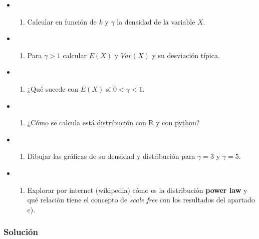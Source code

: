 \documentclass[
]{article}
\providecommand{\tightlist}{%
  \setlength{\itemsep}{0pt}\setlength{\parskip}{0pt}}
\begin{document}
\begin{itemize}
\item
  \begin{enumerate}
  \def\labelenumi{\alph{enumi})}
  \tightlist
  \item
    Calcular en función de \(k\) y \(\gamma\) la densidad de la variable
    \(X\).
  \end{enumerate}
\item
  \begin{enumerate}
  \def\labelenumi{\alph{enumi})}
  \setcounter{enumi}{1}
  \tightlist
  \item
    Para \(\gamma>1\) calcular \(E(X)\) y \(Var(X)\) y su desviación
    típica.
  \end{enumerate}
\item
  \begin{enumerate}
  \def\labelenumi{\alph{enumi})}
  \setcounter{enumi}{2}
  \tightlist
  \item
    ¿Qué sucede con \(E(X)\) si \(0<\gamma<1\).
  \end{enumerate}
\item
  \begin{enumerate}
  \def\labelenumi{\alph{enumi})}
  \setcounter{enumi}{3}
  \tightlist
  \item
    ¿Cómo se calcula está
    \href{https://www.rdocumentation.org/packages/EnvStats/versions/2.3.1/topics/Pareto}{distribución
    con R}
    \href{https://docs.scipy.org/doc/scipy/reference/generated/scipy.stats.Pareto.html}{y
    con python}?
  \end{enumerate}
\item
  \begin{enumerate}
  \def\labelenumi{\alph{enumi})}
  \setcounter{enumi}{4}
  \tightlist
  \item
    Dibujar las gráficas de su densidad y distribución para \(\gamma=3\)
    y \(\gamma=5\).
  \end{enumerate}
\item
  \begin{enumerate}
  \def\labelenumi{\alph{enumi})}
  \setcounter{enumi}{5}
  \tightlist
  \item
    Explorar por internet (wikipedia) cómo es la distribución
    \textbf{power law} y qué relación tiene el concepto de \emph{scale
    free} con los resultados del apartado c).
  \end{enumerate}
\end{itemize}

\hypertarget{soluciuxf3n-1}{%
\subsubsection{Solución}\label{soluciuxf3n-1}}
\end{document}
